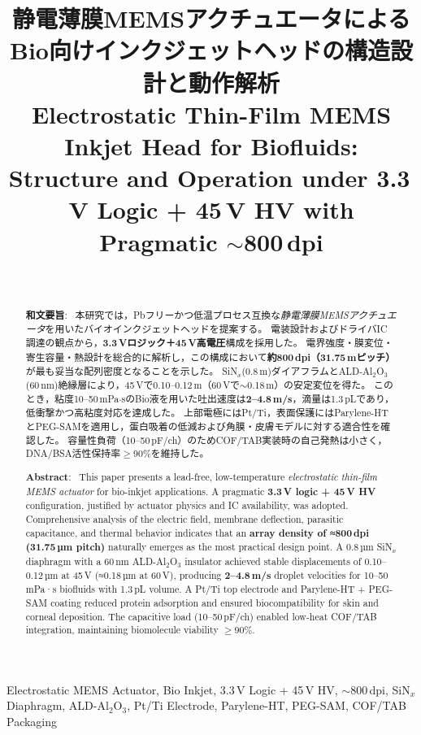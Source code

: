 \documentclass[conference]{IEEEtran}
\title{静電薄膜MEMSアクチュエータによるBio向けインクジェットヘッドの構造設計と動作解析\\
\large Electrostatic Thin-Film MEMS Inkjet Head for Biofluids: Structure and Operation under 3.3\,V Logic + 45\,V HV with Pragmatic \texorpdfstring{$\sim$}{\textasciitilde}800\,dpi}
\author{\IEEEauthorblockN{三溝 真一（Shinichi Samizo)}\\
\IEEEauthorblockA{独立系半導体研究者（元セイコーエプソン）\\
Email: \href{mailto:shin3t72@gmail.com}{shin3t72@gmail.com}\quad
GitHub: \url{https://github.com/Samizo-AITL}}}
\begin{document}
\maketitle

\begin{abstract}
\textbf{和文要旨}:~
本研究では，Pbフリーかつ低温プロセス互換な\emph{静電薄膜MEMSアクチュエータ}を用いたバイオインクジェットヘッドを提案する。
電装設計およびドライバIC調達の観点から，\textbf{3.3\,Vロジック＋45\,V高電圧}構成を採用した。
電界強度・膜変位・寄生容量・熱設計を総合的に解析し，この構成において\textbf{約800\,dpi（31.75\,\textmu mピッチ）}が最も妥当な配列密度となることを示した。
SiN$_x$(0.8\,\textmu m)ダイアフラムとALD-Al$_2$O$_3$(60\,nm)絶縁層により，45\,Vで0.10--0.12\,\textmu m（60\,Vで$\sim$0.18\,\textmu m）の安定変位を得た。
このとき，粘度10--50\,mPa$\cdot$sのBio液を用いた吐出速度は\textbf{2--4.8\,m/s}，滴量は1.3\,pLであり，低衝撃かつ高粘度対応を達成した。
上部電極にはPt/Ti，表面保護にはParylene-HTとPEG-SAMを適用し，蛋白吸着の低減および角膜・皮膚モデルに対する適合性を確認した。
容量性負荷（10--50\,pF/ch）のためCOF/TAB実装時の自己発熱は小さく，DNA/BSA活性保持率$\ge$90\%を維持した。

\medskip
\noindent\textbf{Abstract}:~
This paper presents a lead-free, low-temperature \emph{electrostatic thin-film MEMS actuator} for bio-inkjet applications.
A pragmatic \textbf{3.3\,V logic + 45\,V HV} configuration, justified by actuator physics and IC availability, was adopted.
Comprehensive analysis of the electric field, membrane deflection, parasitic capacitance, and thermal behavior indicates that an \textbf{array density of ≈800\,dpi (31.75\,µm pitch)} naturally emerges as the most practical design point.
A 0.8\,µm SiN$_x$ diaphragm with a 60\,nm ALD-Al$_2$O$_3$ insulator achieved stable displacements of 0.10–0.12\,µm at 45\,V (≈0.18\,µm at 60\,V), producing \textbf{2–4.8\,m/s} droplet velocities for 10–50\,mPa·s biofluids with 1.3\,pL volume.
A Pt/Ti top electrode and Parylene-HT + PEG-SAM coating reduced protein adsorption and ensured biocompatibility for skin and corneal deposition.
The capacitive load (10–50\,pF/ch) enabled low-heat COF/TAB integration, maintaining biomolecule viability $\ge$90\%.
\end{abstract}

\begin{IEEEkeywords}
Electrostatic MEMS Actuator, Bio Inkjet, 3.3\,V Logic + 45\,V HV, $\sim$800\,dpi, SiN$_x$ Diaphragm, ALD-Al$_2$O$_3$, Pt/Ti Electrode, Parylene-HT, PEG-SAM, COF/TAB Packaging
\end{IEEEkeywords}
\end{document}
